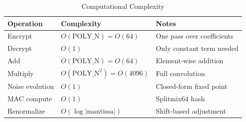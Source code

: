 \documentclass[11pt,a4paper]{article}
\begin{document}
\begin{table}[H]
\centering
\caption{Computational Complexity}
\label{tab:complexity}
\begin{tabular}{@{}lll@{}}
\toprule
\textbf{Operation} & \textbf{Complexity} & \textbf{Notes} \\
\midrule
Encrypt & $O(\text{POLY\_N}) = O(64)$ & One pass over coefficients \\
Decrypt & $O(1)$ & Only constant term needed \\
Add & $O(\text{POLY\_N}) = O(64)$ & Element-wise addition \\
Multiply & $O(\text{POLY\_N}^2) = O(4096)$ & Full convolution \\
Noise evolution & $O(1)$ & Closed-form fixed point \\
MAC compute & $O(1)$ & Splitmix64 hash \\
Renormalize & $O(\log|\text{mantissa}|)$ & Shift-based adjustment \\
\bottomrule
\end{tabular}
\end{table}
\end{document}
